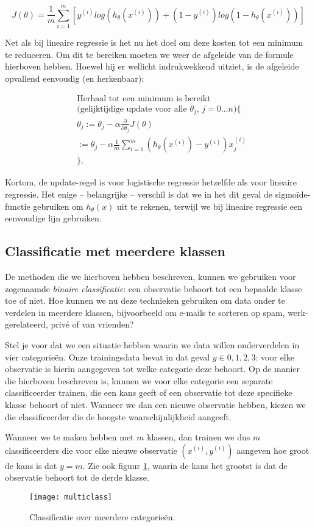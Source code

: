\[
J(\theta) = \frac{1}{m}\sum_{i=1}^m \left[y^{(i)}log(h_\theta(x^{(i)})) + (1-y^{(i)})log(1-h_\theta(x^{(i)}))\right]
\]

Net als bij lineaire regressie is het nu het doel om deze kosten tot een minimum te reduceren. Om dit te bereiken moeten we weer de afgeleide van de formule hierboven hebben. Hoewel hij er wellicht indrukwekkend uitziet, is de afgeleide opvallend eenvoudig (en herkenbaar):

\[
\begin{aligned}
& \textrm{Herhaal tot een minimum is bereikt}\\
& \textrm{(gelijktijdige update voor alle $\theta_j$, $j=0 \hdots n$)}\{\\
& \theta_j := \theta_j - \alpha \frac{\partial}{{\partial}{\theta_j}}J(\theta) \\
& := \theta_j - \alpha \frac{1}{m}\sum_{i=1}^{m} (h_\theta(x^{(i)}) - y^{(i)})x_j^{(i)}\\
&\}.
\end{aligned}
\]

Kortom, de update-regel is voor logistische regressie hetzelfde als voor lineaire regressie. Het enige – belangrijke – verschil is dat we in het dit geval de sigmoïde-functie gebruiken om $h_\theta(x)$ uit te rekenen, terwijl we bij lineaire regressie een eenvoudige lijn gebruiken.

\subsection{Classificatie met meerdere klassen}
De methoden die we hierboven hebben beschreven, kunnen we gebruiken voor zogenaamde \textit{binaire classificatie}: een observatie behoort tot een bepaalde klasse toe of niet. Hoe kunnen we nu deze technieken gebruiken om data onder te verdelen in meerdere klassen, bijvoorbeeld om e-mails te sorteren op spam, werk-gerelateerd, privé of van vrienden? 

Stel je voor dat we een situatie hebben waarin we data willen onderverdelen in vier categorieën. Onze trainingsdata bevat in dat geval $y\in{0,1,2,3}$: voor elke observatie is hierin aangegeven tot welke categorie deze behoort. Op de manier die hierboven beschreven is, kunnen we voor elke categorie een separate classificeerder trainen, die een kans geeft of een observatie tot deze specifieke klasse behoort of niet. Wanneer we dan een nieuwe observatie hebben, kiezen we die classificeerder die de hoogste waarschijnlijkheid aangeeft.

Wanneer we te maken hebben met $m$ klassen, dan trainen we dus $m$ classificeerders die voor elke nieuwe observatie $(x^{(i)}, y^{(i)})$ aangeven hoe groot de kans is dat $y=m$. Zie ook figuur \ref{img:multiclass}, waarin de kans het grootst is dat de observatie behoort tot de derde klasse.

\begin{figure}[h]
\centering
\texttt{[image: multiclass]}
\caption{Classificatie over meerdere categorieën.\label{img:multiclass}}
\end{figure}

